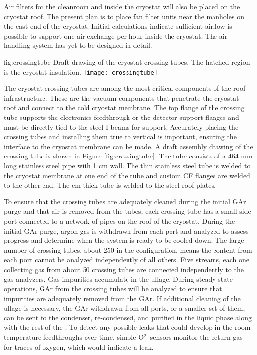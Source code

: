 Air filters for the cleanroom and inside the cryostat will also be placed on the cryostat roof. The present plan is to place fan filter units near the manholes on the east end of the cryostat. Initial calculations indicate sufficient airflow is possible to support one air exchange per hour inside the cryostat. The air handling system has yet to be designed in detail.


\begin{dunefigure}{fig:crossingtube}
  {Draft drawing of the cryostat crossing tubes. The hatched region is the cryostat insulation.}
\texttt{[image: crossingtube]}
\end{dunefigure}

The cryostat crossing tubes are among the most critical components of the roof infrastructure. These are the vacuum components that penetrate the cryostat roof and connect to the cold cryostat membrane. The top flange of the crossing tube supports the electronics feedthrough or the detector support flanges and must be directly tied to the steel I-beams for support. Accurately placing the crossing tubes and installing them true to vertical is important, ensuring the interface to the cryostat membrane can be made. A draft assembly drawing of the crossing tube is shown in Figure \ref{fig:crossingtube}. The tube consists of a 464 \si{mm} long stainless steel pipe with 1 \si{cm} wall. The thin stainless steel tube is welded to the cryostat membrane at one end of the tube and custom CF  flanges are welded to the other end. The \si{cm} thick tube is welded to the steel roof plates.


To ensure that the crossing tubes are adequately cleaned during the initial GAr  purge and that air is removed from the tubes, each crossing tube has a small side port connected to a network of pipes on the roof of the cryostat. During the initial GAr purge, argon gas is withdrawn from each port and analyzed to assess progress and determine when the system is ready to be cooled down. The large number of crossing tubes, about 250 in the  configuration, means the content from each port cannot be analyzed independently of all others. Five streams, each one collecting gas from about 50 crossing tubes are connected independently to the gas analyzers. Gas impurities accumulate in the ullage. During steady state operations, GAr from the crossing tubes will be analyzed to ensure that impurities are adequately removed from the GAr.    If additional cleaning of the ullage is necessary, the GAr withdrawn from all ports, or a smaller set of them, can be sent to the condenser, re-condensed, and purified in the liquid phase along with the rest of the . To detect any possible leaks that could develop in the room temperature feedthroughs over time, simple O$^2$\ sensors monitor the return gas for traces of oxygen, which would indicate a leak.

